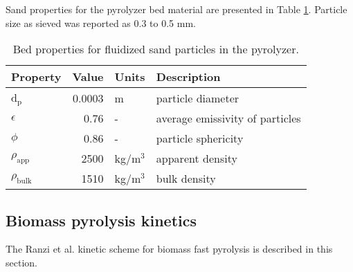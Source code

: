 Sand properties for the pyrolyzer bed material are presented in Table \ref{tab:sand-properties}. Particle size as sieved was reported as 0.3 to 0.5 mm.

\begin{table}[H]
    \centering
    \caption{Bed properties for fluidized sand particles in the pyrolyzer.}
    \label{tab:sand-properties}
    \begin{tabular}{lrll}
        \toprule
        Property & Value & Units & Description \\
        \midrule
        d$_\textrm{p}$ & 0.0003 & m & particle diameter \\
        $\epsilon$ & 0.76 & - & average emissivity of particles \\
        $\phi$ & 0.86 & - & particle sphericity \\
        $\rho_\textrm{app}$ & 2500 & kg/m$^3$ & apparent density \\
        $\rho_\textrm{bulk}$ & 1510 & kg/m$^3$ & bulk density \\
        \bottomrule
    \end{tabular}
\end{table}

\subsection{Biomass pyrolysis kinetics}

The Ranzi et al. kinetic scheme for biomass fast pyrolysis is described in this section.


